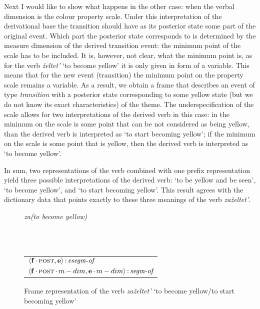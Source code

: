 Next I would like to show what happens in the other case: when the verbal dimension is the colour property scale. Under this interpretation of the derivational base the transition should have as its posterior state some part of the original event. Which part the posterior state corresponds to is determined by the measure dimension of the derived transition event: the minimum point of the scale has to be included. It is, however, not clear, what the minimum point is, as for the verb \textit{\v{z}eltet'} `to become yellow' it is only given in form of a variable. This means that for the new event (transition) the minimum point on the property scale remains a variable. As a result, we obtain a frame that describes an event of type \textit{transition} with a posterior state corresponding to some yellow state (but we do not know its exact characteristics) of the theme. The underspecification of the scale allows for two interpretations of the derived verb in this case: in the minimum on the scale is some point that can be not considered as being yellow, than the derived verb is interpreted as `to start becoming yellow'; if the minimum on the scale is some point that is yellow, then the derived verb is interpreted as `to become yellow'.

In sum, two representations of the verb combined with one prefix representation yield three possible interpretations of the derived verb: `to be yellow and be seen', `to become yellow', and `to start becoming yellow'. This result agrees with the dictionary data that points exactly to these three meanings of the verb \textit{za\v{z}eltet'}. 

\begin{figure}
\textit{za(to become yellow)}\\
\raggedright
{}\medskip\\
\medskip\\\centering
\begin{tabular}[t]{l}
$\langle{\textbf{\textrm{f}}\,{\cdot}\,\textsc{post},\textbf{\textrm{e}}}\rangle\,{:}\,\textit{esegm-of}$\\[1ex]
$\tuple{\btag{f}\BC\POST\C\MDIM,\btag{e}\BC\MDIM}\D\type{segm-of}$\\
\end{tabular}
\caption{Frame representation of the verb \textit{za\v{z}eltet'} `to become yellow/to start becoming yellow' \label{frame:zazeltet:yellow}}
\end{figure}

